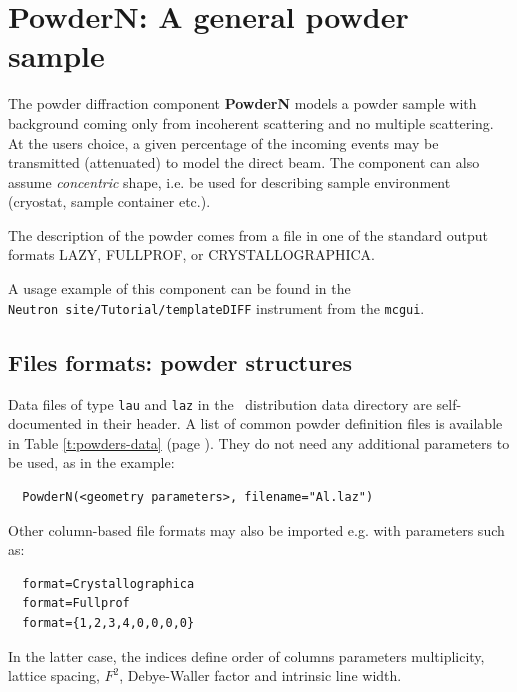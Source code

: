 \section{PowderN: A general powder sample}
\label{powder}


The powder diffraction component {\bf PowderN} models a powder sample
with background coming only from incoherent scattering and no
multiple scattering. At the users choice, a given percentage of the incoming
events may be transmitted (attenuated) to model the direct beam. The component can also
assume \emph{concentric} shape, i.e. be used for describing sample environment (cryostat,
sample container etc.). 

The description of the powder comes from a file in one of the standard output formats LAZY, FULLPROF, or CRYSTALLOGRAPHICA.

A usage example of this component can be found in the \\
\verb+Neutron site/Tutorial/templateDIFF+ instrument from the \verb+mcgui+.

\subsection{Files formats: powder structures}

Data files of type \verb'lau' and \verb'laz' in the \MCS\ distribution data directory are self-documented in their header. A list of common powder definition files is available in Table \ref{t:powders-data} (page \pageref{t:powders-data}). They do not need any additional parameters to be used, as in the example:
\begin{lstlisting}
  PowderN(<geometry parameters>, filename="Al.laz")
\end{lstlisting}
Other column-based file formats may also be imported e.g. with parameters such as:
\begin{lstlisting}
  format=Crystallographica
  format=Fullprof
  format={1,2,3,4,0,0,0,0}
\end{lstlisting}
In the latter case, the indices define order of columns parameters
multiplicity, lattice spacing, $F^2$, Debye-Waller factor and intrinsic line width.

